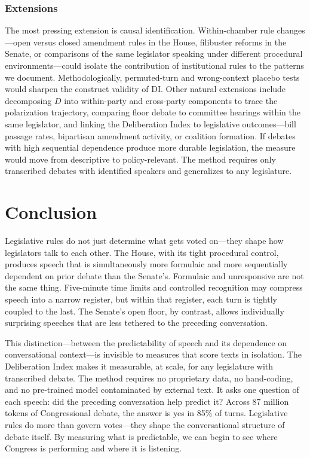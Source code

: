 \documentclass[12pt]{article}
\newcommand{\DI}{\mathit{D}}
\begin{document}
\subsubsection*{Extensions} The most pressing extension is causal identification. Within-chamber rule changes---open versus closed amendment rules in the House, filibuster reforms in the Senate, or comparisons of the same legislator speaking under different procedural environments---could isolate the contribution of institutional rules to the patterns we document. Methodologically, permuted-turn and wrong-context placebo tests would sharpen the construct validity of DI. Other natural extensions include decomposing $\DI$ into within-party and cross-party components to trace the polarization trajectory, comparing floor debate to committee hearings within the same legislator, and linking the Deliberation Index to legislative outcomes---bill passage rates, bipartisan amendment activity, or coalition formation. If debates with high sequential dependence produce more durable legislation, the measure would move from descriptive to policy-relevant. The method requires only transcribed debates with identified speakers and generalizes to any legislature.


\section{Conclusion}

Legislative rules do not just determine what gets voted on---they shape how legislators talk to each other. The House, with its tight procedural control, produces speech that is simultaneously more formulaic and more sequentially dependent on prior debate than the Senate's. Formulaic and unresponsive are not the same thing. Five-minute time limits and controlled recognition may compress speech into a narrow register, but within that register, each turn is tightly coupled to the last. The Senate's open floor, by contrast, allows individually surprising speeches that are less tethered to the preceding conversation.

This distinction---between the predictability of speech and its dependence on conversational context---is invisible to measures that score texts in isolation. The Deliberation Index makes it measurable, at scale, for any legislature with transcribed debate. The method requires no proprietary data, no hand-coding, and no pre-trained model contaminated by external text. It asks one question of each speech: did the preceding conversation help predict it? Across 87 million tokens of Congressional debate, the answer is yes in 85\% of turns. Legislative rules do more than govern votes---they shape the conversational structure of debate itself. By measuring what is predictable, we can begin to see where Congress is performing and where it is listening.
\end{document}
